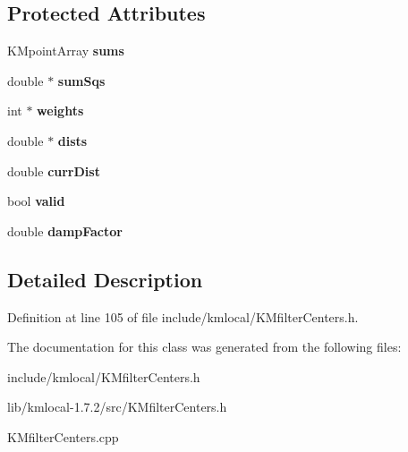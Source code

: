 \subsection*{Protected Attributes}
\begin{DoxyCompactItemize}
\item 
\hypertarget{class_k_mfilter_centers_a6b251a5c1df0adfac945dc0927c2049d}{
KMpointArray {\bfseries sums}}
\label{class_k_mfilter_centers_a6b251a5c1df0adfac945dc0927c2049d}

\item 
\hypertarget{class_k_mfilter_centers_a95390433802f3e89994db4ff1fab0296}{
double $\ast$ {\bfseries sumSqs}}
\label{class_k_mfilter_centers_a95390433802f3e89994db4ff1fab0296}

\item 
\hypertarget{class_k_mfilter_centers_aedab3f5e716b6084d087a83bd70f85d2}{
int $\ast$ {\bfseries weights}}
\label{class_k_mfilter_centers_aedab3f5e716b6084d087a83bd70f85d2}

\item 
\hypertarget{class_k_mfilter_centers_a633204df0d935ed267891851392b0dc1}{
double $\ast$ {\bfseries dists}}
\label{class_k_mfilter_centers_a633204df0d935ed267891851392b0dc1}

\item 
\hypertarget{class_k_mfilter_centers_aef6020ba62e41ef7f1e3d41b62beb02b}{
double {\bfseries currDist}}
\label{class_k_mfilter_centers_aef6020ba62e41ef7f1e3d41b62beb02b}

\item 
\hypertarget{class_k_mfilter_centers_aaaf78ee46cbea2fa82e96baf97596e18}{
bool {\bfseries valid}}
\label{class_k_mfilter_centers_aaaf78ee46cbea2fa82e96baf97596e18}

\item 
\hypertarget{class_k_mfilter_centers_aa03bb641e650f74a9c344ae202e5275e}{
double {\bfseries dampFactor}}
\label{class_k_mfilter_centers_aa03bb641e650f74a9c344ae202e5275e}

\end{DoxyCompactItemize}


\subsection{Detailed Description}


Definition at line 105 of file include/kmlocal/KMfilterCenters.h.



The documentation for this class was generated from the following files:\begin{DoxyCompactItemize}
\item 
include/kmlocal/KMfilterCenters.h\item 
lib/kmlocal-\/1.7.2/src/KMfilterCenters.h\item 
KMfilterCenters.cpp\end{DoxyCompactItemize}
